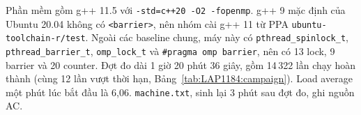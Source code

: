 Phần mềm gồm g++ 11.5 với \texttt{-std=c++20 -O2 -fopenmp}. g++ 9 mặc định của Ubuntu 20.04 không có
\texttt{<barrier>}, nên nhóm cài g++ 11 từ PPA \texttt{ubuntu-toolchain-r/test}. Ngoài các baseline
chung, máy này có \texttt{pthread\_spinlock\_t}, \texttt{pthread\_barrier\_t}, \texttt{omp\_lock\_t}
và \texttt{\#pragma omp barrier}, nên có 13 lock, 9 barrier và 20 counter. Đợt đo dài 1 giờ 20 phút
36 giây, gồm 14\,322 lần chạy hoàn thành (cùng 12 lần vượt thời hạn, Bảng~\ref{tab:LAP1184:campaign}).
Load average một phút lúc bắt đầu là 6,06. \texttt{machine.txt}, sinh lại 3 phút sau đợt đo, ghi nguồn
AC.
